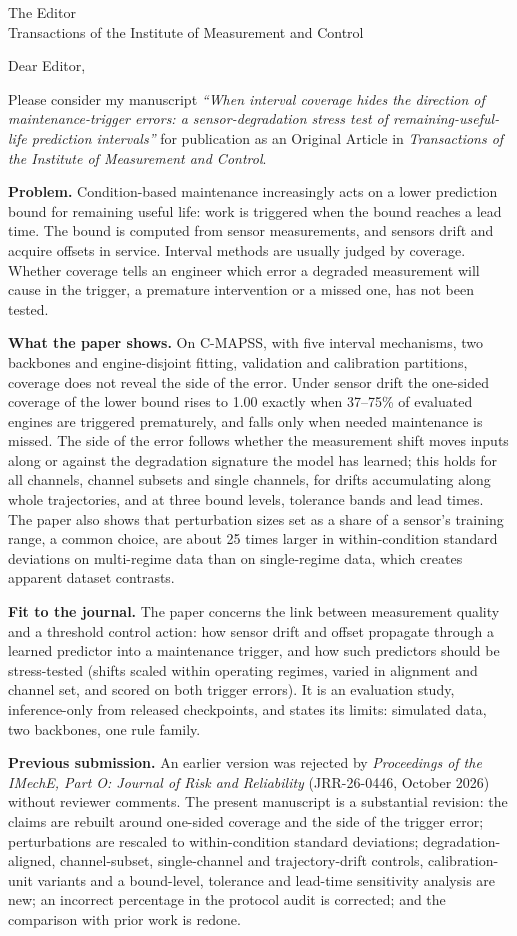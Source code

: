 \documentclass[11pt]{letter}
\newcommand{\PTITLE}{When interval coverage hides the direction of maintenance-trigger errors: a sensor-degradation stress test of remaining-useful-life prediction intervals}
\begin{document}
\begin{letter}{The Editor\\Transactions of the Institute of Measurement and Control}
\opening{Dear Editor,}

Please consider my manuscript \emph{``\PTITLE''} for publication as an Original Article in \emph{Transactions of the Institute of Measurement and Control}.

\textbf{Problem.} Condition-based maintenance increasingly acts on a lower prediction bound for remaining useful life: work is triggered when the bound reaches a lead time. The bound is computed from sensor measurements, and sensors drift and acquire offsets in service. Interval methods are usually judged by coverage. Whether coverage tells an engineer which error a degraded measurement will cause in the trigger, a premature intervention or a missed one, has not been tested.

\textbf{What the paper shows.} On C-MAPSS, with five interval mechanisms, two backbones and engine-disjoint fitting, validation and calibration partitions, coverage does not reveal the side of the error. Under sensor drift the one-sided coverage of the lower bound rises to 1.00 exactly when 37--75\% of evaluated engines are triggered prematurely, and falls only when needed maintenance is missed. The side of the error follows whether the measurement shift moves inputs along or against the degradation signature the model has learned; this holds for all channels, channel subsets and single channels, for drifts accumulating along whole trajectories, and at three bound levels, tolerance bands and lead times. The paper also shows that perturbation sizes set as a share of a sensor's training range, a common choice, are about 25 times larger in within-condition standard deviations on multi-regime data than on single-regime data, which creates apparent dataset contrasts.

\textbf{Fit to the journal.} The paper concerns the link between measurement quality and a threshold control action: how sensor drift and offset propagate through a learned predictor into a maintenance trigger, and how such predictors should be stress-tested (shifts scaled within operating regimes, varied in alignment and channel set, and scored on both trigger errors). It is an evaluation study, inference-only from released checkpoints, and states its limits: simulated data, two backbones, one rule family.

\textbf{Previous submission.} An earlier version was rejected by \emph{Proceedings of the IMechE, Part O: Journal of Risk and Reliability} (JRR-26-0446, October 2026) without reviewer comments. The present manuscript is a substantial revision: the claims are rebuilt around one-sided coverage and the side of the trigger error; perturbations are rescaled to within-condition standard deviations; degradation-aligned, channel-subset, single-channel and trajectory-drift controls, calibration-unit variants and a bound-level, tolerance and lead-time sensitivity analysis are new; an incorrect percentage in the protocol audit is corrected; and the comparison with prior work is redone.


\end{letter}
\end{document}

